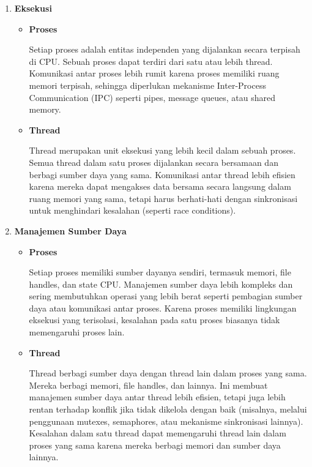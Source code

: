 \documentclass[12pt]{article}
\begin{document}
\begin{enumerate}
\begin{itemize}
        \end{itemize}
        \item\textbf{Eksekusi}
        \begin{itemize}
            \item\textbf{Proses} 
            \par \hspace{2em} Setiap proses adalah entitas independen yang dijalankan secara terpisah di CPU. Sebuah proses dapat terdiri dari satu atau lebih thread. Komunikasi antar proses lebih rumit karena proses memiliki ruang memori terpisah, sehingga diperlukan mekanisme Inter-Process Communication (IPC) seperti pipes, message queues, atau shared memory.
            \item\textbf{Thread}
            \par \hspace{2em} Thread merupakan unit eksekusi yang lebih kecil dalam sebuah proses. Semua thread dalam satu proses dijalankan secara bersamaan dan berbagi sumber daya yang sama. Komunikasi antar thread lebih efisien karena mereka dapat mengakses data bersama secara langsung dalam ruang memori yang sama, tetapi harus berhati-hati dengan sinkronisasi untuk menghindari kesalahan (seperti race conditions).
        \end{itemize}
        \item\textbf{Manajemen Sumber Daya}
        \begin{itemize}
            \item\textbf{Proses} 
            \par \hspace{2em} Setiap proses memiliki sumber dayanya sendiri, termasuk memori, file handles, dan state CPU. Manajemen sumber daya lebih kompleks dan sering membutuhkan operasi yang lebih berat seperti pembagian sumber daya atau komunikasi antar proses. Karena proses memiliki lingkungan eksekusi yang terisolasi, kesalahan pada satu proses biasanya tidak memengaruhi proses lain.
            \item\textbf{Thread}
            \par \hspace{2em} Thread berbagi sumber daya dengan thread lain dalam proses yang sama. Mereka berbagi memori, file handles, dan lainnya. Ini membuat manajemen sumber daya antar thread lebih efisien, tetapi juga lebih rentan terhadap konflik jika tidak dikelola dengan baik (misalnya, melalui penggunaan mutexes, semaphores, atau mekanisme sinkronisasi lainnya). Kesalahan dalam satu thread dapat memengaruhi thread lain dalam proses yang sama karena mereka berbagi memori dan sumber daya lainnya.
        \end{itemize}
    \end{enumerate}
\end{document}
